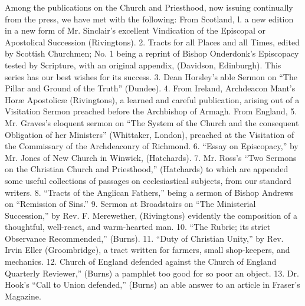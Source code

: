 Among the publications on the Church and
Priesthood, now issuing continually from the press, we have met with the
following: From Scotland, l. a new edition in a new form of Mr. Sinclair's
excellent Vindication of the Episcopal or Apostolical Succession (Rivingtons).
2. Tracts for all Places and all Times, edited by Scottish Churchmen;
No. 1 being a reprint of Bishop Onderdonk's Episcopacy tested by
Scripture, with an original appendix, (Davidson, Edinburgh). This series
has our best wishes for its success. 3. Dean Horsley's able Sermon on ``The
Pillar and Ground of the Truth'' (Dundee). 4. From Ireland, Archdeacon
Mant's Horæ Apostolicæ (Rivingtons), a learned and careful
publication, arising out of a Visitation Sermon preached before the
Archbishop of Armagh. From England, 5. Mr. Graves's eloquent sermon on ``The
System of the Church and the consequent Obligation of her Ministers''
(Whittaker, London), preached at the Visitation of the Commissary of the
Archdeaconry of Richmond. 6. ``Essay on Episcopacy,'' by Mr. Jones of New
Church in Winwick, (Hatchards). 7. Mr. Ross's ``Two Sermons on the
Christian Church and Priesthood,'' (Hatchards) to which are appended some
useful collections of passages on ecclesiastical subjects, from our
standard writers. 8. ``Tracts of the Anglican Fathers,'' being a sermon of
Bishop Andrews on ``Remission of Sins.'' 9. Sermon at Broadstairs on ``The
Ministerial Succession,'' by Rev. F. Merewether, (Rivingtons) evidently
the composition of a thoughtful, well-react, and warm-hearted man. 10. ``The
Rubric; its strict Observance Recommended,'' (Burns). 11. ``Duty of
Christian Unity,'' by Rev. Irvin Eller (Groombridge), a tract written for
farmers, small shop-keepers, and mechanics. 12. Church of England
defended against the Church of England Quarterly Reviewer,'' (Burns) a
pamphlet too good for so poor an object. 13. Dr. Hook's ``Call to Union
defended,'' (Burns) an able answer to an article in Fraser's Magazine.

